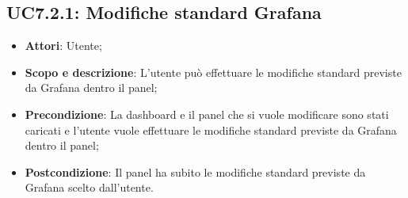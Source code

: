 \subsection{UC7.2.1: Modifiche standard Grafana}
\hypertarget{UC7.2.1}{}
\begin{itemize}
	\item \textbf{Attori}: Utente;
	\item \textbf{Scopo e descrizione}: L'utente può effettuare le modifiche standard previste da Grafana dentro il panel;
	\item \textbf{Precondizione}: La dashboard e il panel che si vuole modificare sono stati caricati e l'utente vuole effettuare le modifiche standard previste da Grafana dentro il panel;
	\item \textbf{Postcondizione}: Il panel ha subito le modifiche standard previste da Grafana scelto dall'utente.
\end{itemize}